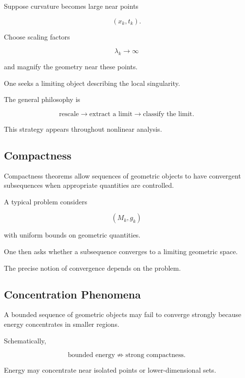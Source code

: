 Suppose curvature becomes large near points

\[
(x_k,t_k).
\]

Choose scaling factors

\[
\lambda_k\to\infty
\]

and magnify the geometry near these points.

One seeks a limiting object describing the local singularity.

The general philosophy is

\[
\boxed{
\text{rescale}
\longrightarrow
\text{extract a limit}
\longrightarrow
\text{classify the limit}.
}
\]

This strategy appears throughout nonlinear analysis.

\subsection{Compactness}
\label{subsec:geometric-analysis-compactness}

Compactness theorems allow sequences of geometric objects to have
convergent subsequences when appropriate quantities are controlled.

A typical problem considers

\[
(M_k,g_k)
\]

with uniform bounds on geometric quantities.

One then asks whether a subsequence converges to a limiting geometric
space.

The precise notion of convergence depends on the problem.

\subsection{Concentration Phenomena}
\label{subsec:geometric-concentration}

A bounded sequence of geometric objects may fail to converge strongly
because energy concentrates in smaller regions.

Schematically,

\[
\boxed{
\text{bounded energy}
\not\Rightarrow
\text{strong compactness}.
}
\]

Energy may concentrate near isolated points or lower-dimensional sets.

